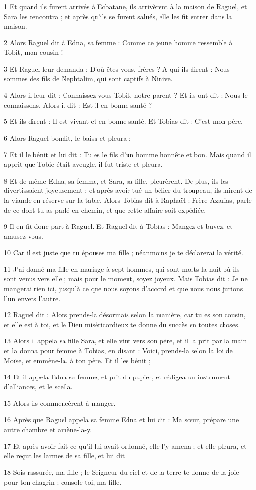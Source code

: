 \par 1 Et quand ils furent arrivés à Ecbatane, ils arrivèrent à la maison de Raguel, et Sara les rencontra ; et après qu'ils se furent salués, elle les fit entrer dans la maison.
\par 2 Alors Raguel dit à Edna, sa femme : Comme ce jeune homme ressemble à Tobit, mon cousin !
\par 3 Et Raguel leur demanda : D'où êtes-vous, frères ? A qui ils dirent : Nous sommes des fils de Nephtalim, qui sont captifs à Ninive.
\par 4 Alors il leur dit : Connaissez-vous Tobit, notre parent ? Et ils ont dit : Nous le connaissons. Alors il dit : Est-il en bonne santé ?
\par 5 Et ils dirent : Il est vivant et en bonne santé. Et Tobias dit : C'est mon père.
\par 6 Alors Raguel bondit, le baisa et pleura :
\par 7 Et il le bénit et lui dit : Tu es le fils d'un homme honnête et bon. Mais quand il apprit que Tobie était aveugle, il fut triste et pleura.
\par 8 Et de même Edna, sa femme, et Sara, sa fille, pleurèrent. De plus, ils les divertissaient joyeusement ; et après avoir tué un bélier du troupeau, ils mirent de la viande en réserve sur la table. Alors Tobias dit à Raphaël : Frère Azarias, parle de ce dont tu as parlé en chemin, et que cette affaire soit expédiée.
\par 9 Il en fit donc part à Raguel. Et Raguel dit à Tobias : Mangez et buvez, et amusez-vous.
\par 10 Car il est juste que tu épouses ma fille ; néanmoins je te déclarerai la vérité.
\par 11 J'ai donné ma fille en mariage à sept hommes, qui sont morts la nuit où ils sont venus vers elle ; mais pour le moment, soyez joyeux. Mais Tobias dit : Je ne mangerai rien ici, jusqu'à ce que nous soyons d'accord et que nous nous jurions l'un envers l'autre.
\par 12 Raguel dit : Alors prends-la désormais selon la manière, car tu es son cousin, et elle est à toi, et le Dieu miséricordieux te donne du succès en toutes choses.
\par 13 Alors il appela sa fille Sara, et elle vint vers son père, et il la prit par la main et la donna pour femme à Tobias, en disant : Voici, prends-la selon la loi de Moïse, et emmène-la. à ton père. Et il les bénit ;
\par 14 Et il appela Edna sa femme, et prit du papier, et rédigea un instrument d'alliances, et le scella.
\par 15 Alors ils commencèrent à manger.
\par 16 Après que Raguel appela sa femme Edna et lui dit : Ma sœur, prépare une autre chambre et amène-la-y.
\par 17 Et après avoir fait ce qu'il lui avait ordonné, elle l'y amena ; et elle pleura, et elle reçut les larmes de sa fille, et lui dit :
\par 18 Sois rassurée, ma fille ; le Seigneur du ciel et de la terre te donne de la joie pour ton chagrin : console-toi, ma fille.

